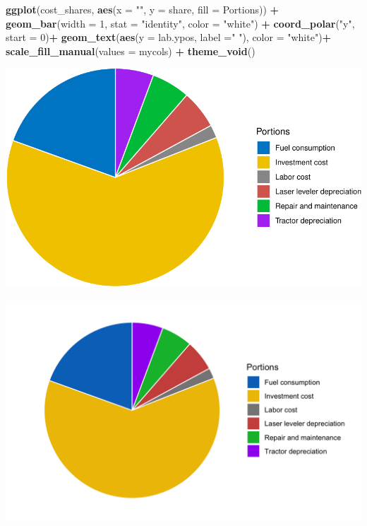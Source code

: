 \documentclass[
]{article}
\newenvironment{Shaded}{\begin{snugshade}}{\end{snugshade}}
\newcommand{\AttributeTok}[1]{\textcolor[rgb]{0.13,0.29,0.53}{#1}}
\newcommand{\DecValTok}[1]{\textcolor[rgb]{0.00,0.00,0.81}{#1}}
\newcommand{\FunctionTok}[1]{\textcolor[rgb]{0.13,0.29,0.53}{\textbf{#1}}}
\newcommand{\NormalTok}[1]{#1}
\newcommand{\SpecialCharTok}[1]{\textcolor[rgb]{0.81,0.36,0.00}{\textbf{#1}}}
\newcommand{\StringTok}[1]{\textcolor[rgb]{0.31,0.60,0.02}{#1}}
\begin{document}
\begin{Shaded}
\begin{Highlighting}[]
\FunctionTok{ggplot}\NormalTok{(cost\_shares, }\FunctionTok{aes}\NormalTok{(}\AttributeTok{x =} \StringTok{""}\NormalTok{, }\AttributeTok{y =}\NormalTok{ share, }\AttributeTok{fill =}\NormalTok{ Portions)) }\SpecialCharTok{+}
  \FunctionTok{geom\_bar}\NormalTok{(}\AttributeTok{width =} \DecValTok{1}\NormalTok{, }\AttributeTok{stat =} \StringTok{"identity"}\NormalTok{, }\AttributeTok{color =} \StringTok{"white"}\NormalTok{) }\SpecialCharTok{+}
  \FunctionTok{coord\_polar}\NormalTok{(}\StringTok{"y"}\NormalTok{, }\AttributeTok{start =} \DecValTok{0}\NormalTok{)}\SpecialCharTok{+}
  \FunctionTok{geom\_text}\NormalTok{(}\FunctionTok{aes}\NormalTok{(}\AttributeTok{y =}\NormalTok{ lab.ypos, }\AttributeTok{label =}\StringTok{" "}\NormalTok{), }\AttributeTok{color =} \StringTok{"white"}\NormalTok{)}\SpecialCharTok{+}
  \FunctionTok{scale\_fill\_manual}\NormalTok{(}\AttributeTok{values =}\NormalTok{ mycols) }\SpecialCharTok{+}
  \FunctionTok{theme\_void}\NormalTok{()}
\end{Highlighting}
\end{Shaded}

\includegraphics{Laser_leveling_simulation_files/figure-latex/cost-benefit-analysis-1.pdf}

\includegraphics{images/Cost_portions.png}
\end{document}

